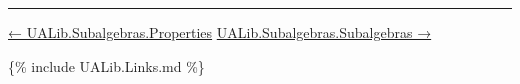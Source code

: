 \begin{code}
\AgdaSpace{}%
\AgdaSymbol{(}\AgdaSpace{}%
\AgdaSpace{}%
\AgdaSymbol{)(}\AgdaSpace{}%
\AgdaSymbol{)}\AgdaSpace{}%
\<%
\\
%
\>[2]\AgdaSymbol{(}\AgdaSpace{}%
\AgdaSpace{}%
\AgdaSymbol{)(}\AgdaSpace{}%
\AgdaSpace{}%
\AgdaSpace{}%
\AgdaSpace{}%
\AgdaSymbol{)}%
\>[24]\AgdaSpace{}%
\AgdaSymbol{(}\AgdaSpace{}%
\AgdaSpace{}%
\AgdaSpace{}%
\AgdaSpace{}%
\AgdaSpace{}%
\AgdaSpace{}%
\AgdaSymbol{)}\AgdaSpace{}%
\<%
\\
%
\>[2]\AgdaSpace{}%
\AgdaSpace{}%
\AgdaSpace{}%
\AgdaSymbol{((}\AgdaSpace{}%
\AgdaSpace{}%
\AgdaSymbol{)}\AgdaSpace{}%
\AgdaSpace{}%
\AgdaSymbol{)}%
\>[24]\<%
\\
\>[0][@{}l@{\AgdaIndent{0}}]%
\>[1]\AgdaSpace{}%
\AgdaSpace{}%
\AgdaSymbol{=}\AgdaSpace{}%
\AgdaSpace{}%
\AgdaSpace{}%
\AgdaSpace{}%
\AgdaSymbol{\{}\AgdaSymbol{\}\{}\AgdaSymbol{\}}\AgdaSpace{}%
\AgdaSpace{}%
\AgdaSymbol{\{}\AgdaSymbol{\}\{}\AgdaSymbol{\}}\AgdaSpace{}%
\AgdaSpace{}%
\AgdaSpace{}%
\AgdaSpace{}%
\AgdaSpace{}%
\AgdaSymbol{(}\AgdaSpace{}%
\AgdaSymbol{)}\AgdaSpace{}%
\AgdaSymbol{(}\AgdaSpace{}%
\AgdaSpace{}%
\AgdaSpace{}%
\AgdaSymbol{)}\<%
\\
\>[0]\<%
\end{code}

\begin{center}\rule{0.5\linewidth}{\linethickness}\end{center}

\href{UALib.Subalgebras.Properties.html}{← UALib.Subalgebras.Properties}
{\href{UALib.Subalgebras.Subalgebras.html}{UALib.Subalgebras.Subalgebras
→}}

\{\% include UALib.Links.md \%\}
